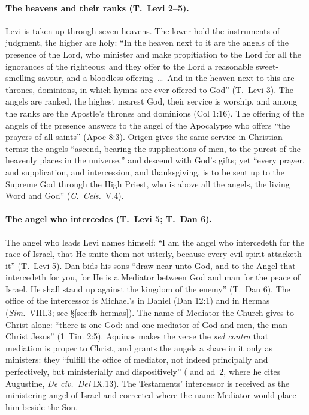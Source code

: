 \paragraph{The heavens and their ranks (T.~Levi 2--5).} Levi is taken up
through seven heavens. The lower hold the instruments of judgment, the
higher are holy: ``In the heaven next to it are the angels of the presence
of the Lord, who minister and make propitiation to the Lord for all the
ignorances of the righteous; and they offer to the Lord a reasonable
sweet-smelling savour, and a bloodless offering~\dots\ And in the heaven next
to this are thrones, dominions, in which hymns are ever offered to God''
(T.~Levi 3). The angels are ranked,
the highest nearest God, their service is worship, and among the ranks are
the Apostle's thrones and dominions (Col 1:16). The offering of the angels of
the presence answers to the angel of the Apocalypse who offers ``the prayers
of all saints'' (Apoc 8:3). Origen gives the same service in Christian terms: the
angels ``ascend, bearing the supplications of men, to the purest of the
heavenly places in the universe,'' and descend with God's gifts; yet ``every
prayer, and supplication, and intercession, and thanksgiving, is to be sent
up to the Supreme God through the High Priest, who is above all the angels,
the living Word and God'' (\emph{C.\ Cels.}\ V.4).

\paragraph{The angel who intercedes (T.~Levi 5; T.~Dan 6).} The angel who
leads Levi names himself: ``I am the angel who intercedeth for the race of
Israel, that He smite them not utterly, because every evil spirit attacketh
it'' (T.~Levi 5). Dan bids his sons ``draw near unto God, and to the Angel
that intercedeth for you, for He is a Mediator between God and man for the
peace of Israel. He shall stand up against the kingdom of the enemy'' (T.~Dan
6). The office of the intercessor is Michael's in Daniel (Dan 12:1) and in
Hermas (\emph{Sim.}\ VIII.3; see \S\ref{sec:fb-hermas}). The name of
Mediator the Church gives to Christ alone: ``there is one God: and one
mediator of God and men, the man Christ Jesus'' (1~Tim 2:5). Aquinas makes
the verse the \emph{sed contra} that mediation is proper to Christ, and
grants the angels a share in it only as ministers: they ``fulfill the office
of mediator, not indeed principally and perfectively, but ministerially and
dispositively'' ( and ad~2, where he cites Augustine,
\emph{De civ.\ Dei} IX.13). The Testaments' intercessor is received as the
ministering angel of Israel and corrected where the name Mediator would
place him beside the Son.

